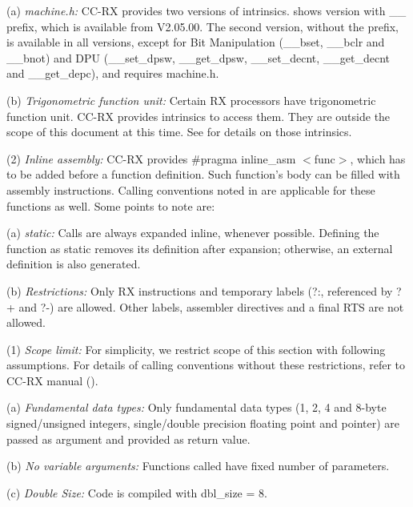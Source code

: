     \leveltwo
    (a) \emph{machine.h:} %
    CC-RX provides two versions of intrinsics.  shows version
    with \_\_ prefix, which is available from V2.05.00. The second version, without the prefix, is 
    available in all versions, except for Bit Manipulation (\_\_bset, \_\_bclr and \_\_bnot) and 
    DPU (\_\_set\_dpsw, \_\_get\_dpsw, \_\_set\_decnt, \_\_get\_decnt and \_\_get\_depc), and 
    requires machine.h.

    (b) \emph{Trigonometric function unit:} %
    Certain RX processors have trigonometric function unit. CC-RX provides intrinsics to access them.
    They are outside the scope of this document at this time. See \cite{rx_compiler} for details on those intrinsics.

\levelone
(2) \emph{Inline assembly:} %
CC-RX provides \#pragma inline\_asm $<$func$>$, which has to be added before a function definition.
Such function's body can be filled with assembly instructions. Calling conventions noted in 
 are applicable for these functions as well. 
Some points to note are:

    \leveltwo
    (a) \emph{static:} %
    Calls are always expanded inline, whenever possible. Defining the function as static removes 
    its definition after expansion; otherwise, an external definition is also generated.

    (b) \emph{Restrictions:} %
    Only RX instructions and temporary labels (?:, referenced by ?+ and ?-) are allowed. Other 
    labels, assembler directives and a final RTS are not allowed.



\SOPNoteBody

(1) \emph{Scope limit:} %
For simplicity, we restrict scope of this section with following assumptions. For details of calling 
conventions without these restrictions, refer to CC-RX manual (\cite{rx_compiler}).

    \leveltwo
    (a) \emph{Fundamental data types:} %
    Only fundamental data types (1, 2, 4 and 8-byte signed/unsigned integers, single/double precision
    floating point and pointer) are passed as argument and provided as return value.

    (b) \emph{No variable arguments:} %
    Functions called have fixed number of parameters.

    (c) \emph{Double Size:} %
    Code is compiled with dbl\_size = 8.

